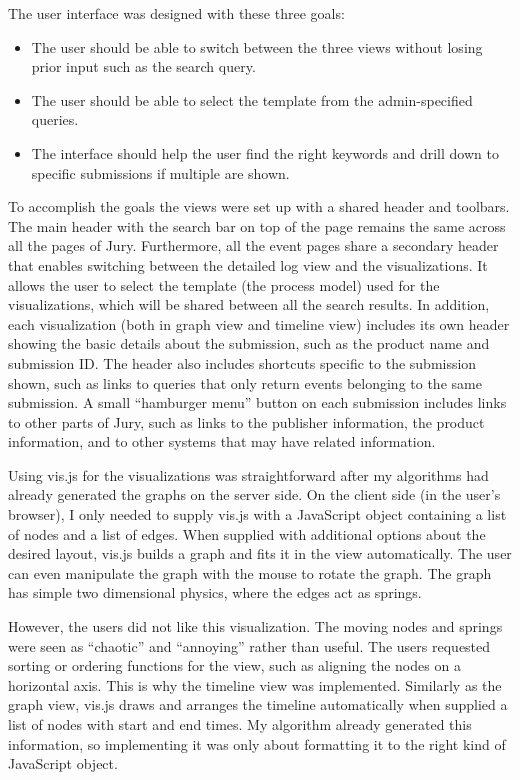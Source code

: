 The user interface was designed with these three goals:
\begin{itemize}
    \item The user should be able to switch between the three views without losing prior input such as the search query.
    \item The user should be able to select the template from the admin-specified queries.
    \item The interface should help the user find the right keywords and drill down to specific submissions if multiple are shown.
\end{itemize}

To accomplish the goals the views were set up with a shared header and toolbars.
The main header with the search bar on top of the page remains the same across all the pages of Jury.
Furthermore, all the event pages share a secondary header that enables switching between the detailed log view and the visualizations. 
It allows the user to select the template (the process model) used for the visualizations, which will be shared between all the search results.
In addition, each visualization (both in graph view and timeline view) includes its own header showing the basic details about the submission, such as the product name and submission ID. The header also includes shortcuts specific to the submission shown, such as links to queries that only return events belonging to the same submission.
A small ``hamburger menu'' button on each submission includes links to other parts of Jury, such as links to the publisher information, the product information, and to other systems that may have related information.

Using vis.js for the visualizations was straightforward after my algorithms had already generated the graphs on the server side. 
On the client side (in the user's browser), I only needed to supply vis.js with a JavaScript object containing a list of nodes and a list of edges. When supplied with additional options about the desired layout, vis.js builds a graph and fits it in the view automatically. The user can even manipulate the graph with the mouse to rotate the graph. The graph has simple two dimensional physics, where the edges act as springs.

However, the users did not like this visualization. The moving nodes and springs were seen as ``chaotic'' and ``annoying'' rather than useful. 
The users requested sorting or ordering functions for the view, such as aligning the nodes on a horizontal axis. 
This is why the timeline view was implemented. 
Similarly as the graph view, vis.js draws and arranges the timeline automatically when supplied a list of nodes with start and end times.
My algorithm already generated this information, so implementing it was only about formatting it to the right kind of JavaScript object.

